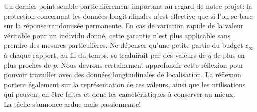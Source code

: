 \documentclass[a4paper,11pt]{article} %
\begin{document}
Un dernier point semble particulièrement important au regard de notre projet: la protection concernant les données longitudinales n'est effective que si l'on se base sur la réponse randomisée permanente.
En cas de variation rapide de la valeur véritable pour un individu donné, cette garantie n'est plus applicable sans prendre des mesures particulières. 
Ne dépenser qu'une petite partie du budget $\epsilon_\infty$ à chaque rapport, au fil du temps, se traduirait par des valeurs de $q$ de plus en plus proches de $p$. 
Nous devrons certainement approfondir cette réflexion pour pouvoir travailler avec des données longitudinales de localisation. 
La réflexion portera également sur la représentation de ces valeurs, ainsi que les utilisations qui peuvent en être faites et donc les caractéristiques à conserver au mieux.\\[-0.4em]

La tâche s'annonce ardue mais passionnante!
\newpage

\end{document}
